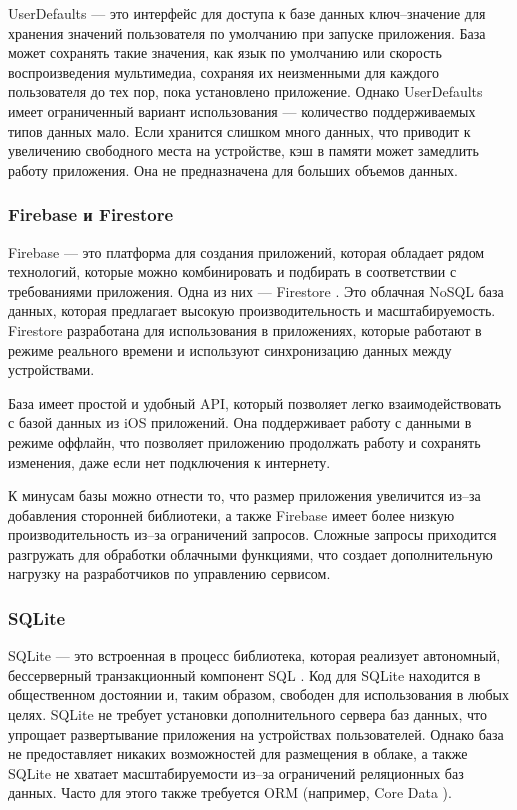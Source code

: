 UserDefaults \cite{userdefaults}--- это интерфейс для доступа к базе данных ключ--значение для хранения значений пользователя по умолчанию при запуске приложения. База может сохранять такие значения, как язык по умолчанию или скорость воспроизведения мультимедиа, сохраняя их неизменными для каждого пользователя до тех пор, пока установлено приложение. Однако UserDefaults имеет ограниченный вариант использования --- количество поддерживаемых типов данных мало. Если хранится слишком много данных, что приводит к увеличению свободного места на устройстве, кэш в памяти может замедлить работу приложения. Она не предназначена для больших объемов данных.

\subsubsection{Firebase и Firestore}

Firebase \cite{firebase} --- это платформа для создания приложений, которая обладает рядом технологий, которые можно комбинировать и подбирать в соответствии с требованиями приложения. Одна из них --- Firestore \cite{firestore}. Это облачная NoSQL \cite{nosql} база данных, которая предлагает высокую производительность и масштабируемость. Firestore разработана для использования в приложениях, которые работают в режиме реального времени и используют синхронизацию данных между устройствами.

База имеет простой и удобный API, который позволяет легко взаимодействовать с базой данных из iOS приложений. Она поддерживает работу с данными в режиме оффлайн, что позволяет приложению продолжать работу и сохранять изменения, даже если нет подключения к интернету.

К минусам базы можно отнести то, что размер приложения увеличится из--за добавления сторонней библиотеки, а также Firebase имеет более низкую производительность из--за ограничений запросов. Сложные запросы приходится разгружать для обработки облачными функциями, что создает дополнительную нагрузку на разработчиков по управлению сервисом. 

\subsubsection{SQLite}

SQLite \cite{sqlite} --- это встроенная в процесс библиотека, которая реализует автономный, бессерверный транзакционный компонент SQL \cite{sql}. Код для SQLite находится в общественном достоянии и, таким образом, свободен для использования в любых целях.
SQLite не требует установки дополнительного сервера баз данных, что упрощает развертывание приложения на устройствах пользователей. Однако база не предоставляет никаких возможностей для размещения в облаке, а также SQLite не хватает масштабируемости из--за ограничений реляционных баз данных. Часто для этого также требуется ORM (например, Core Data \cite{coredata}).

